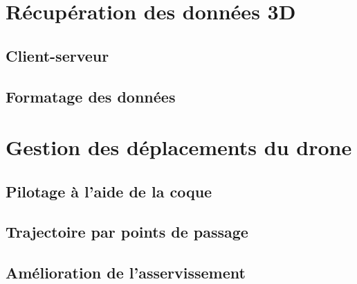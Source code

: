     \section{Récupération des données 3D}

        \subsection{Client-serveur}

        \subsection{Formatage des données}


    \section{Gestion des déplacements du drone}

        \subsection{Pilotage à l'aide de la coque}

        \subsection{Trajectoire par points de passage}

        \subsection{Amélioration de l'asservissement}
